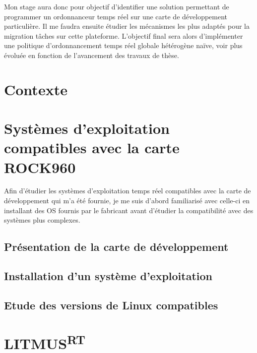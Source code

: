 \documentclass{article}
\newcommand{\litmus}{LITMUS\textsuperscript{RT}}
\begin{document}
    Mon stage aura donc pour objectif d'identifier une solution permettant de programmer un \gls{ordonnanceur} temps réel sur une carte de développement particulière. Il me faudra ensuite étudier les mécanismes les plus adaptés pour la migration tâches sur cette plateforme. L'objectif final sera alors d'implémenter une politique d'\gls{ordonnancement} temps réel globale hétérogène naïve, voir plus évoluée en fonction de l'avancement des travaux de thèse.
    
    \newpage
    \section{Contexte}
    
    


    \newpage
    \section[OS compatibles avec la carte]{Systèmes d'exploitation compatibles avec la carte ROCK960}

    Afin d'étudier les systèmes d'exploitation temps réel compatibles avec la carte de développement qui m'a été fournie, je me suis d'abord familiarisé avec celle-ci en installant des OS fournis par le fabricant avant d'étudier la compatibilité avec des systèmes plus complexes.


    \subsection{Présentation de la carte de développement}
    

    \subsection{Installation d'un système d'exploitation}
    

    \subsection{Etude des versions de Linux compatibles}
    




    
    \newpage
    \section{\litmus}
    \label{section:litmus}
    
\end{document}
